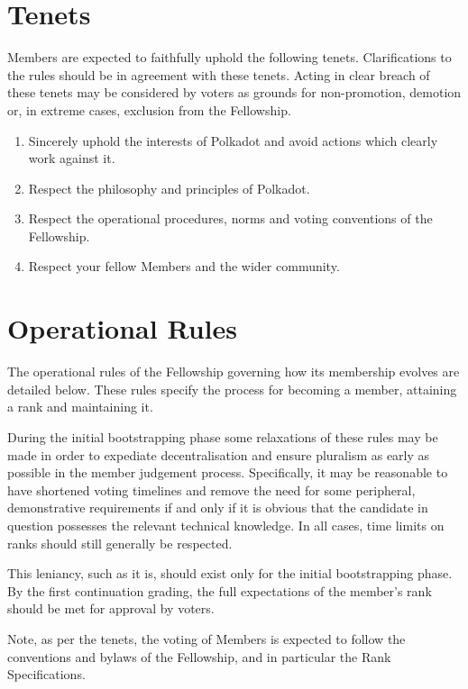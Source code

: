\documentclass[9pt,oneside]{amsart}
\begin{document}
\section{Tenets}

Members are expected to faithfully uphold the following tenets. Clarifications to the rules should be in agreement with these tenets. Acting in clear breach of these tenets may be considered by voters as grounds for non-promotion, demotion or, in extreme cases, exclusion from the Fellowship.

\begin{enumerate}
\item Sincerely uphold the interests of Polkadot and avoid actions which clearly work against it.
\item Respect the philosophy and principles of Polkadot.
\item Respect the operational procedures, norms and voting conventions of the Fellowship.
\item Respect your fellow Members and the wider community.
\end{enumerate}

\section{Operational Rules}\label{operational-rules}

The operational rules of the Fellowship governing how its membership evolves are detailed below. These rules specify the process for becoming a member, attaining a rank and maintaining it.

During the initial bootstrapping phase some relaxations of these rules may be made in order to expediate decentralisation and ensure pluralism as early as possible in the member judgement process. Specifically, it may be reasonable to have shortened voting timelines and remove the need for some peripheral, demonstrative requirements if and only if it is obvious that the candidate in question possesses the relevant technical knowledge. In all cases, time limits on ranks should still generally be respected.

This leniancy, such as it is, should exist only for the initial bootstrapping phase. By the first  continuation grading, the full expectations of the member's rank should be met for approval by voters.

Note, as per the tenets, the voting of Members is expected to follow the conventions and bylaws of the Fellowship, and in particular the Rank Specifications.
\end{document}
